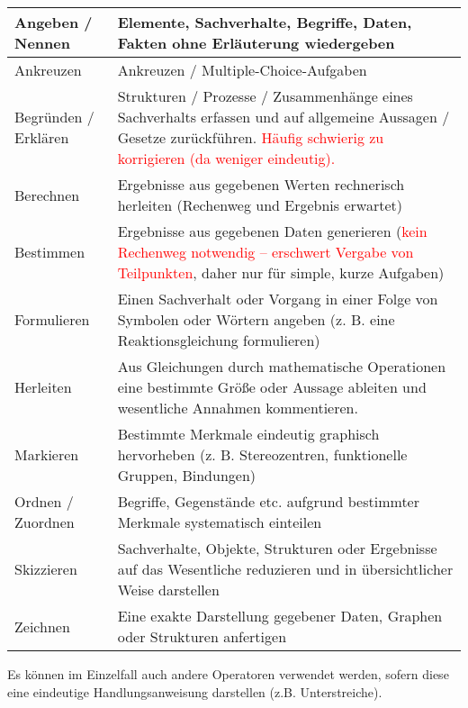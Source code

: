 \documentclass[./main.tex]{subfiles}
\begin{document}
\begin{tabular}{|C{2.2cm}|L{13.7cm}|}\hline
Angeben / Nennen & Elemente, Sachverhalte, Begriffe, Daten, Fakten ohne Erl\"auterung wiedergeben \\\hline
Ankreuzen & Ankreuzen / Multiple-Choice-Aufgaben \\\hline
Begr\"unden / Erkl\"aren & Strukturen / Prozesse / Zusammenh\"ange eines Sachverhalts erfassen und auf allgemeine Aussagen / Gesetze zur\"uckf\"uhren.\newline
\textcolor{red}{H\"aufig schwierig zu korrigieren (da weniger eindeutig).} \\\hline
Berechnen & Ergebnisse aus gegebenen Werten rechnerisch herleiten (Rechenweg und Ergebnis erwartet)\\\hline
Bestimmen & Ergebnisse aus gegebenen Daten generieren (\textcolor{red}{kein Rechenweg notwendig -- erschwert Vergabe von Teilpunkten}, daher nur f\"ur simple, kurze Aufgaben)\\\hline
Formulieren & Einen Sachverhalt oder Vorgang in einer Folge von Symbolen oder W\"ortern angeben (z. B. eine Reaktionsgleichung formulieren) \\\hline
Herleiten & Aus Gleichungen durch mathematische Operationen eine bestimmte Gr\"o\ss{}e oder Aussage ableiten und wesentliche Annahmen kommentieren. \\\hline
Markieren & Bestimmte Merkmale eindeutig graphisch hervorheben
(z. B. Stereozentren, funktionelle Gruppen, Bindungen) \\\hline
Ordnen / Zuordnen & Begriffe, Gegenst\"ande etc. aufgrund bestimmter Merkmale systematisch einteilen \\\hline
Skizzieren & Sachverhalte, Objekte, Strukturen oder Ergebnisse auf das Wesentliche reduzieren und in \"ubersichtlicher Weise darstellen \\\hline
Zeichnen & Eine exakte Darstellung gegebener Daten, Graphen oder Strukturen anfertigen \\\hline
\end{tabular}

Es k\"onnen im Einzelfall auch andere Operatoren verwendet werden, sofern diese eine eindeutige Handlungsanweisung darstellen (z.B. Unterstreiche). 
\end{document}
